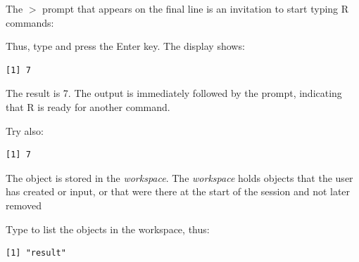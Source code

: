 \noindent
The \texttt{$>$} prompt that appears on the final line
is an invitation to start typing R commands:

Thus, type  and press the Enter key.
The display shows:
\begin{knitrout}
\color{fgcolor}\begin{kframe}
\begin{alltt}
\hlstd{> }\hlopt{+}
\end{alltt}
\begin{verbatim}
[1] 7
\end{verbatim}
\end{kframe}
\end{knitrout}
\noindent
{}
The result is 7. The output is immediately followed by the \txtt{>}
prompt, indicating that R is ready for another command.

Try also:
\begin{knitrout}
\color{fgcolor}\begin{kframe}
\begin{alltt}
\hlstd{> } \hlkwb{<-} \hlopt{+}
\hlstd{> }
\end{alltt}
\begin{verbatim}
[1] 7
\end{verbatim}
\end{kframe}
\end{knitrout}

The object  is stored in the \textit{workspace}.
The {\em workspace} holds objects that the user has created or input,
or that were there at the start of the session and not later removed

Type  to list the objects in the workspace, thus:
\begin{knitrout}
\color{fgcolor}\begin{kframe}
\begin{alltt}
\hlstd{> }\hlstd{()}
\end{alltt}
\begin{verbatim}
[1] "result"
\end{verbatim}
\end{kframe}
\end{knitrout}


